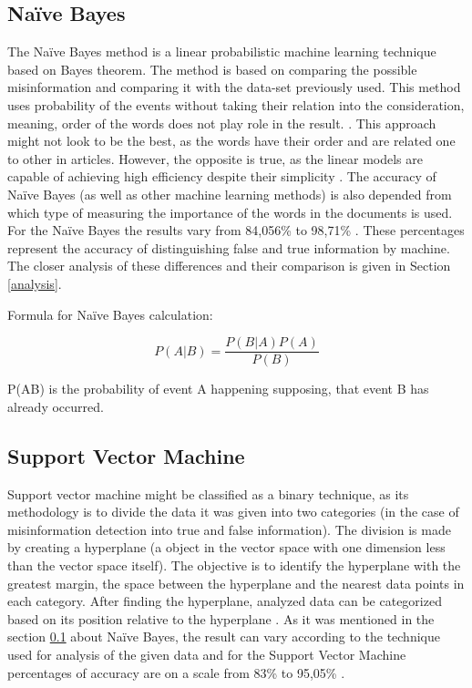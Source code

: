 \documentclass[11pt ,english,a4paper]{article}
\begin{document}
\subsection{Naïve Bayes}\label{nb}
The Naïve Bayes method is a linear probabilistic machine learning technique based on Bayes theorem. The method is based on comparing the possible misinformation and comparing it with the data-set previously used. This method uses probability of the events without taking their relation into the consideration, meaning, order of the words does not play role in the result. \cite{sha20mach}. This approach might not look to be the best, as the words have their order and are related one to other in articles. However, the opposite is true, as the linear models are capable of achieving high efficiency despite their simplicity \cite{pod19mach}. The accuracy of Naïve Bayes (as well as other machine learning methods) is also depended from which type of measuring the importance of the words in the documents is used. For the Naïve Bayes the results vary from 84,056\% \cite{sha20mach} to 98,71\% \cite{bar21health}. These percentages represent the accuracy of distinguishing false and true information by machine. The closer analysis of these differences and their comparison is given in Section \ref{analysis}.

Formula for Naïve Bayes calculation: \cite{sha20mach}

\begin{equation}
P(A|B) = \frac{P(B|A)P(A)}{P(B)}
\end{equation}

P(A\textbar B) is the probability of event A happening supposing, that event B has already occurred.

\subsection{Support Vector Machine}\label{svm}
Support vector machine might be classified as a binary technique, as its methodology is to divide the data it was given into two categories \cite{pod19mach} (in the case of misinformation detection into true and false information). The division is made by creating a hyperplane (a object in the vector space with one dimension less than the vector space itself). The objective is to identify the hyperplane with the greatest margin, the space between the hyperplane and the nearest data points in each category. After finding the hyperplane, analyzed data can be categorized based on its position relative to the hyperplane \cite{sha20mach}.
As it was mentioned in the section \ref{nb} about Naïve Bayes, the result can vary according to the technique used for analysis of the given data and for the Support Vector Machine percentages of accuracy are on a scale from 83\% \cite{chap22unmask} to 95,05\% \cite{sha20mach}.
\end{document}
